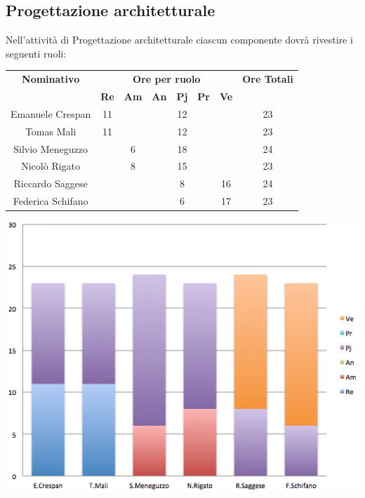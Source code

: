 \subsection{Progettazione architetturale}
Nell'attività di Progettazione architetturale ciascun componente dovrà rivestire i seguenti ruoli:
\begin{center}
  \centering
  \begin{tabular} {|c|c|c|c|c|c|c|c|}
    \hline
    \textbf{Nominativo} & \multicolumn{6}{|c|}{\textbf{Ore per ruolo}} & \textbf{Ore Totali} \\
    & \textbf{Re} & \textbf{Am} & \textbf{An} & \textbf{Pj} & \textbf{Pr} & \textbf{Ve} & \\
    \hline
    Emanuele Crespan &11 & & &12 & & &23\\
    \hline
    Tomas Mali &11 & & &12 & & &23\\
    \hline
    Silvio Meneguzzo & &6 & &18 & & &24\\
    \hline
    Nicolò Rigato & &8 & &15 & & &23\\
    \hline
    Riccardo Saggese & & & &8 & &16 &24\\
    \hline
    Federica Schifano & & & &6 & &17 &23\\
    \hline
  \end{tabular}
  \includegraphics[scale=0.65]{img/fig3.png}
\end{center}

